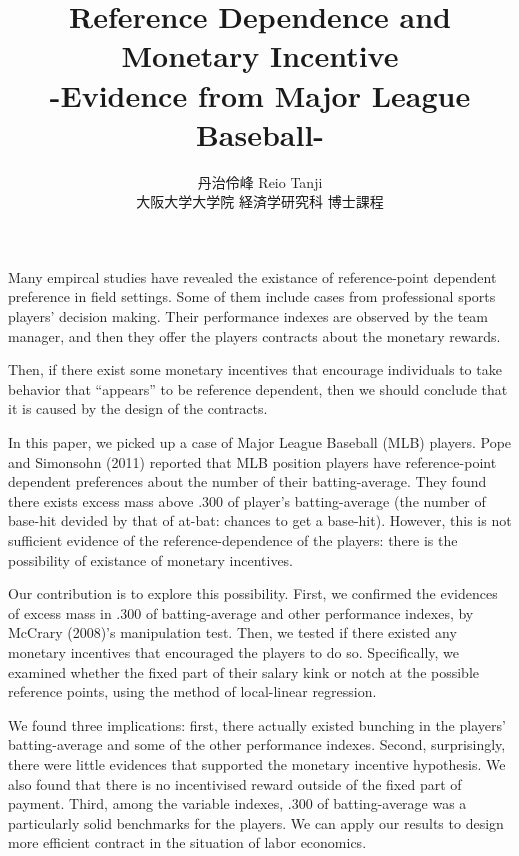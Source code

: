 \documentclass[dvipdfmx, 11pt]{jsarticle}
\begin{document}
\title{Reference Dependence and Monetary Incentive \\
-Evidence from Major League Baseball-}
\author{丹治伶峰 Reio Tanji \\
大阪大学大学院 経済学研究科 博士課程}
\date{}
\maketitle

Many empircal studies have revealed the existance of reference-point dependent preference in field settings. Some of them include cases from professional sports players' decision making. Their performance indexes are observed by the team manager, and then they offer the players contracts about the monetary rewards.

Then, if there exist some monetary incentives that encourage individuals to take behavior that ``appears'' to be reference dependent, then we should conclude that it is caused by the design of the contracts.

In this paper, we picked up a case of Major League Baseball (MLB) players. Pope and Simonsohn (2011) reported that MLB position players have reference-point dependent preferences about the number of their batting-average. They found there exists excess mass above .300 of player's batting-average (the number of base-hit devided by that of at-bat: chances to get a base-hit). However, this is not sufficient evidence of the reference-dependence of the players: there is the possibility of existance of monetary incentives.

Our contribution is to explore this possibility. First, we confirmed the evidences of excess mass in .300 of batting-average and other performance indexes, by McCrary (2008)'s manipulation test. Then, we tested if there existed any monetary incentives that encouraged the players to do so. Specifically, we examined whether the fixed part of their salary kink or notch at the possible reference points, using the method of local-linear regression.

We found three implications: first, there actually existed bunching in the players' batting-average and some of the other performance indexes. Second, surprisingly, there were little evidences that supported the monetary incentive hypothesis. We also found that there is no incentivised reward outside of the fixed part of payment. Third, among the variable indexes, .300 of batting-average was a particularly solid benchmarks for the players. We can apply our results to design more efficient contract in the situation of labor economics.
\end{document}
